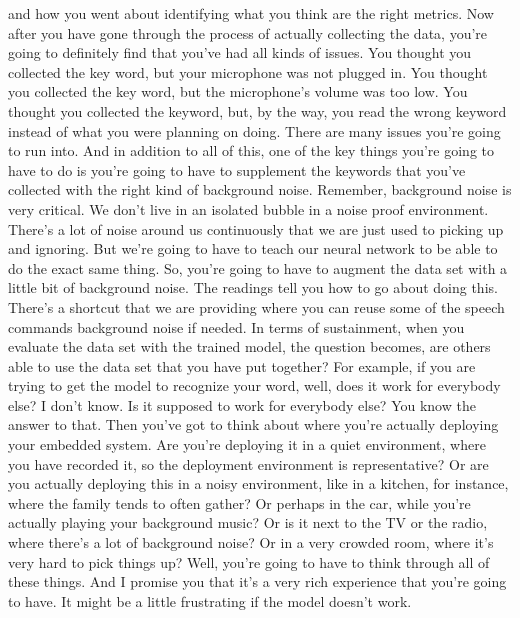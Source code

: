     and how you went about identifying what you think are the right metrics.
    Now after you have gone through the process of actually collecting
    the data, you're going to definitely find
    that you've had all kinds of issues.
    You thought you collected the key word, but your microphone was not plugged in.
    You thought you collected the key word, but the microphone's volume
    was too low.
    You thought you collected the keyword, but, by the way,
    you read the wrong keyword instead of what you were planning on doing.
    There are many issues you're going to run into.
    And in addition to all of this, one of the key things
    you're going to have to do is you're going
    to have to supplement the keywords that you've
    collected with the right kind of background noise.
    Remember, background noise is very critical.
    We don't live in an isolated bubble in a noise proof environment.
    There's a lot of noise around us continuously that we are just
    used to picking up and ignoring.
    But we're going to have to teach our neural network
    to be able to do the exact same thing.
    So, you're going to have to augment the data set
    with a little bit of background noise.
    The readings tell you how to go about doing this.
    There's a shortcut that we are providing where
    you can reuse some of the speech commands background noise if needed.
    In terms of sustainment, when you evaluate the data set with the trained
    model, the question becomes, are others able to use the data
    set that you have put together?
    For example, if you are trying to get the model to recognize your word, well,
    does it work for everybody else?
    I don't know.
    Is it supposed to work for everybody else?
    You know the answer to that.
    Then you've got to think about where you're actually
    deploying your embedded system.
    Are you're deploying it in a quiet environment, where
    you have recorded it, so the deployment environment is representative?
    Or are you actually deploying this in a noisy environment, like in a kitchen,
    for instance, where the family tends to often gather?
    Or perhaps in the car, while you're actually playing your background music?
    Or is it next to the TV or the radio, where
    there's a lot of background noise?
    Or in a very crowded room, where it's very hard to pick things up?
    Well, you're going to have to think through all of these things.
    And I promise you that it's a very rich experience that you're going to have.
    It might be a little frustrating if the model doesn't work.
